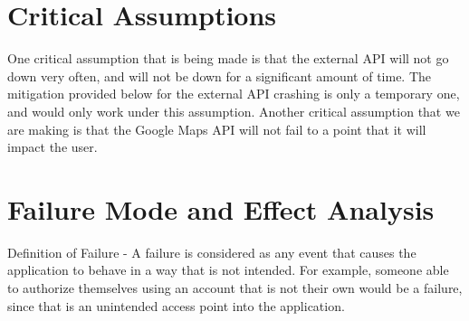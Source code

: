 \documentclass{article}
\begin{document}
\section{Critical Assumptions}

One critical assumption that is being made is that the external API will not go down very often, and will not be down for a significant amount
of time. The mitigation provided below for the external API crashing is only a temporary one, and would only work under this assumption. Another critical
assumption that we are making is that the Google Maps API will not fail to a point that it will impact the user.

\section{Failure Mode and Effect Analysis}

Definition of Failure - A failure is considered as any event that causes the application to behave in a way that is not intended. For example, someone
able to authorize themselves using an account that is not their own would be a failure, since that is an unintended access point into the application.
\end{document}
